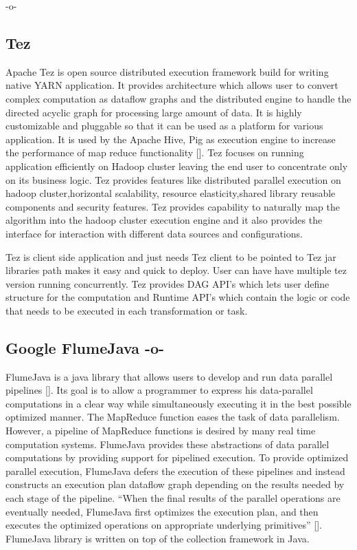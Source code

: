 -o-


\subsection{Tez}

Apache Tez is open source distributed execution framework build for
writing native YARN application. It provides architecture which allows
user to convert complex computation as dataflow graphs and the
distributed engine to handle the directed acyclic graph for processing
large amount of data. It is highly customizable and pluggable so that
it can be used as a platform for various application. It is used by
the Apache Hive, Pig as execution engine to increase the performance
of map reduce functionality [\cite{www-apache-tez}]. Tez focuses on
running application efficiently on Hadoop cluster leaving the end user
to concentrate only on its business logic. Tez provides features like
distributed parallel execution on hadoop cluster,horizontal
scalability, resource elasticity,shared library reusable components
and security features. Tez provides capability to naturally map the
algorithm into the hadoop cluster execution engine and it also
provides the interface for interaction with different data sources and
configurations.
  
Tez is client side application and just needs Tez client to be pointed
to Tez jar libraries path makes it easy and quick to deploy. User can
have have multiple tez version running concurrently. Tez provides DAG
API's which lets user define structure for the computation and Runtime
API's which contain the logic or code that needs to be executed in
each transformation or task.

\subsection{Google FlumeJava -o-}

FlumeJava is a java library that allows users to develop and run data
parallel pipelines [\cite{www-flumejava-google}]. Its goal is to allow a
programmer to express his data-parallel computations in a clear way
while simultaneously executing it in the best possible optimized
manner. The MapReduce function eases the task of data
parallelism. However, a pipeline of MapReduce functions is desired by
many real time computation systems. FlumeJava provides these
abstractions of data parallel computations by providing support for
pipelined execution. To provide optimized parallel execution,
FlumeJava defers the execution of these pipelines and instead
constructs an execution plan dataflow graph depending on the results
needed by each stage of the pipeline. ``When the final results of the
parallel operations are eventually needed, FlumeJava first optimizes
the execution plan, and then executes the optimized operations on
appropriate underlying primitives'' [\cite{flumejava-paper}]. FlumeJava
library is written on top of the collection framework in Java.

